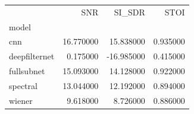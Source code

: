 \begin{tabular}{lrrr}
\toprule
 & SNR & SI_SDR & STOI \\
model &  &  &  \\
\midrule
cnn & 16.770000 & 15.838000 & 0.935000 \\
deepfilternet & 0.175000 & -16.985000 & 0.415000 \\
fullsubnet & 15.093000 & 14.128000 & 0.922000 \\
spectral & 13.044000 & 12.192000 & 0.894000 \\
wiener & 9.618000 & 8.726000 & 0.886000 \\
\bottomrule
\end{tabular}
